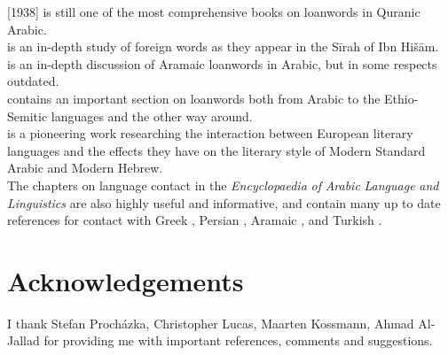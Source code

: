 \documentclass[output=paper]{langsci/langscibook}
\begin{document}
\citet{Jeffrey2007} [1938] is still one of the most comprehensive books on loanwords in Quranic Arabic.\\
\citet{Hebbo1984} is an in-depth study of foreign words as they appear in the Sīrah of Ibn Hišām.\\
\citet{Fraenkel1886} is an in-depth discussion of Aramaic loanwords in Arabic, but in some respects outdated.\\
\citet{Nöldeke1910} contains an important section on loanwords both from Arabic to the Ethio-Semitic languages and the other way around.\\
\citet{Blau1969} is a pioneering work researching the interaction between European literary languages and the effects they have on the literary style of Modern Standard Arabic and Modern Hebrew.\\
The chapters on language contact in the \textit{Encyclopaedia} \textit{of} \textit{Arabic} \textit{Language} \textit{and} \textit{Linguistics} are also highly useful and informative, and contain many up to date references for contact with Greek \citep{Gutas2011}, Persian \citep{Asbaghi2011}, Aramaic \cite{Retsö2011}, and Turkish \citep{Procházka2011Turkish}.

\section*{Acknowledgements}
I thank Stefan Procházka, Christopher Lucas, Maarten Kossmann, Ahmad Al-Jallad for providing me with important references, comments and suggestions.
\end{document}
